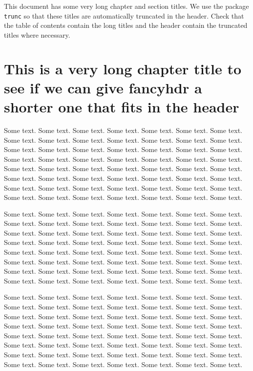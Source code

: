 \documentclass[oneside]{book}
\begin{document}
\thispagestyle{plain}
\tableofcontents

\bigskip

This document has some very long chapter and section titles. We use the package \texttt{trunc} so that these titles are automatically truncated in the header.
Check that the table of contents contain the long titles and the header contain the truncated titles where necessary.

\chapter{This is a very long chapter title to see if we can give fancyhdr a shorter one that fits in the header}
\pagestyle{fancy}
\thispagestyle{fancy}
\fancyhead[LO,RE]{\nouppercase{\truncate{0.9\headwidth}{\leftmark}}} %

Some text. Some text. Some text. Some text. Some text. Some text. Some text. Some text. Some text. Some text. Some text. Some text. Some text. Some text. Some text. Some text. Some text. Some text. Some text. Some text. Some text. Some text. Some text. Some text. Some text. Some text. Some text. Some text. Some text. Some text. Some text. Some text. Some text. Some text. Some text. Some text. Some text. Some text. Some text. Some text. Some text. Some text. Some text. Some text. Some text. Some text. Some text. Some text. Some text. Some text. Some text. Some text. Some text. Some text. Some text. Some text. 

Some text. Some text. Some text. Some text. Some text. Some text. Some text. Some text. Some text. Some text. Some text. Some text. Some text. Some text. Some text. Some text. Some text. Some text. Some text. Some text. Some text. Some text. Some text. Some text. Some text. Some text. Some text. Some text. Some text. Some text. Some text. Some text. Some text. Some text. Some text. Some text. Some text. Some text. Some text. Some text. Some text. Some text. Some text. Some text. Some text. Some text. Some text. Some text. Some text. Some text. Some text. Some text. Some text. Some text. Some text. Some text. 

Some text. Some text. Some text. Some text. Some text. Some text. Some text. Some text. Some text. Some text. Some text. Some text. Some text. Some text. Some text. Some text. Some text. Some text. Some text. Some text. Some text. Some text. Some text. Some text. Some text. Some text. Some text. Some text. Some text. Some text. Some text. Some text. Some text. Some text. Some text. Some text. Some text. Some text. Some text. Some text. Some text. Some text. Some text. Some text. Some text. Some text. Some text. Some text. Some text. Some text. Some text. Some text. Some text. Some text. Some text. Some text. 
\end{document}
